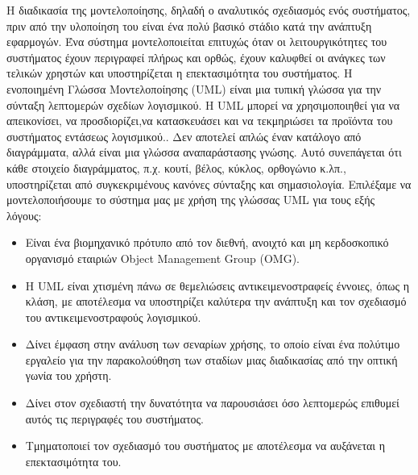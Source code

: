 	Η διαδικασία της μοντελοποίησης, δηλαδή ο αναλυτικός σχεδιασμός ενός συστήματος, πριν από την υλοποίηση του είναι ένα πολύ βασικό στάδιο κατά την ανάπτυξη εφαρμογών. Ένα σύστημα μοντελοποιείται επιτυχώς όταν οι λειτουργικότητες του συστήματος έχουν περιγραφεί πλήρως και ορθώς, έχουν καλυφθεί οι ανάγκες των τελικών χρηστών και υποστηρίζεται η επεκτασιμότητα του συστήματος. 
	Η ενοποιημένη Γλώσσα Μοντελοποίησης (UML) είναι μια τυπική γλώσσα για την σύνταξη λεπτομερών σχεδίων λογισμικού. Η UML μπορεί να χρησιμοποιηθεί για να απεικονίσει, να προσδιορίζει,να κατασκευάσει και να τεκμηριώσει τα προϊόντα του συστήματος εντάσεως λογισμικού.\cite{Booch2005}. Δεν αποτελεί απλώς έναν κατάλογο από διαγράμματα, αλλά είναι μια γλώσσα αναπαράστασης γνώσης. Αυτό συνεπάγεται ότι κάθε στοιχείο διαγράμματος, π.χ. κουτί, βέλος, κύκλος, ορθογώνιο κ.λπ., υποστηρίζεται από συγκεκριμένους κανόνες σύνταξης και σημασιολογία.
	 Επιλέξαμε να μοντελοποιήσουμε το σύστημα μας με χρήση της γλώσσας UML για τους εξής λόγους:
	 \begin{itemize}
	 \item Είναι ένα βιομηχανικό πρότυπο από τον διεθνή, ανοιχτό και μη κερδοσκοπικό οργανισμό εταιριών Object Management Group (OMG).
	 \item Η UML είναι χτισμένη πάνω σε θεμελιώσεις αντικειμενοστραφείς έννοιες, όπως η κλάση, με αποτέλεσμα να υποστηρίζει καλύτερα την ανάπτυξη και τον σχεδιασμό του αντικειμενοστραφούς λογισμικού.
	 \item Δίνει έμφαση στην ανάλυση των σεναρίων χρήσης, το οποίο είναι ένα πολύτιμο εργαλείο για την παρακολούθηση των σταδίων μιας διαδικασίας από την οπτική γωνία του χρήστη.
	 \item Δίνει στον σχεδιαστή την δυνατότητα να παρουσιάσει όσο λεπτομερώς επιθυμεί αυτός τις περιγραφές του συστήματος.
	 \item Τμηματοποιεί τον σχεδιασμό του συστήματος με αποτέλεσμα να αυξάνεται η επεκτασιμότητα του.
\end{itemize}	 

